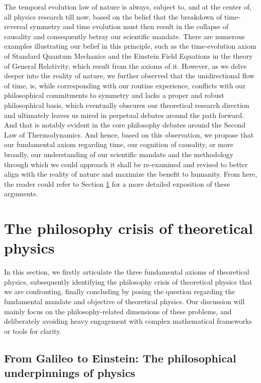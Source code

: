 \documentclass{article}
\begin{document}
The temporal evolution law of nature is always, subject to, and at the center of, all physics research till now, based on the belief that the breakdown of time-reversal symmetry and time evolution must then result in the collapse of causality and consequently betray our scientific mandate. \cite{Yates2025} There are numerous examples illustrating our belief in this principle, such as the time-evolution axiom of Standard Quantum Mechanics and the Einstein Field Equations in the theory of General Relativity, which result from the axioms of it. However, as we delve deeper into the reality of nature, we further observed that the unidirectional flow of time, is, while corresponding with our routine experience, conflicts with our philosophical commitments to symmetry and lacks a proper and robust philosophical basis, which eventually obscures our theoretical research direction and ultimately leaves us mired in perpetual debates around the path forward. And that is notably evident in the core philosophy debates around the Second Law of Thermodynamics. \cite{LandauLifshitzV5_2011} And hence, based on this observation, we propose that our fundamental axiom regarding time, our cognition of causality, or more broadly, our understanding of our scientific mandate and the methodology through which we could approach it shall be re-examined and revised to better align with the reality of nature and maximize the benefit to humanity. From here, the reader could refer to Section \hyperref[sec:crisis]{\ref{sec:crisis}} for a more detailed exposition of these arguments.

\section{The philosophy crisis of theoretical physics}
\label{sec:crisis}

In this section, we firstly articulate the three fundamental axioms of theoretical physics, subsequently identifying the philosophy crisis of theoretical physics that we are confronting, finally concluding by posing the question regarding the fundamental mandate and objective of theoretical physics. Our discussion will mainly focus on the philosophy-related dimensions of these problems, and deliberately avoiding heavy engagement with complex mathematical frameworks or tools for clarity.

\subsection{From Galileo to Einstein: The philosophical underpinnings of physics}
\end{document}
